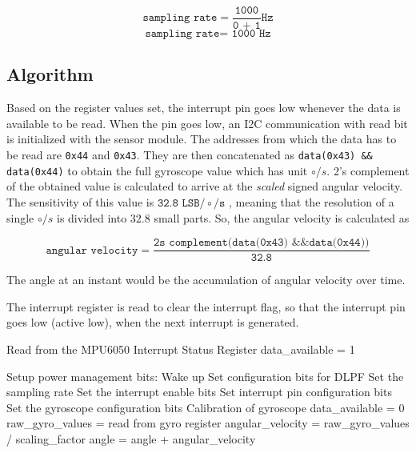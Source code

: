 \documentclass{article}
\begin{document}
	$$ \texttt{sampling rate} = \frac{\texttt{1000}}{\texttt{0 + 1}} \texttt{Hz}$$
	$$ \texttt{sampling rate} = \texttt{ 1000 Hz}$$
	
	
	\subsection{Algorithm}
	
	Based on the register values set, the interrupt pin goes low whenever the data is available to be read. When the pin goes low, an I2C communication with read bit is initialized with  the sensor module. The addresses from which the data has to be read are \texttt{0x44} and \texttt{0x43}. They are then concatenated as \texttt{data(0x43) \&\& data(0x44)} to obtain the full gyroscope value which has unit $\circ/s$. 2's complement of the obtained value is calculated to arrive at the \textit{scaled} signed angular velocity. The sensitivity of this value is $ \texttt{32.8 LSB}/\circ/\texttt{s}$ , meaning that the resolution of a single $\circ/s$ is divided into 32.8 small parts. So, the angular velocity is calculated as 
	
	$$\texttt{angular velocity} = \frac{\texttt{2s complement(data(0x43) \&\& data(0x44))}}{\texttt{32.8}} $$
	
	The angle at an instant would be the accumulation of angular velocity over time.
	
	The interrupt register is read to clear the interrupt flag, so that the interrupt pin goes low (active low), when the next interrupt is generated.
	
	\begin{algorithm}
		\label{algo:isr}
		\caption{Interrupt Service Routine (ISR)}
		\begin{algorithmic}[1]
			\State Read from the MPU6050 Interrupt Status Register
			\State data\_available = 1
		\end{algorithmic}
	\end{algorithm}
	
	\begin{algorithm}
	\label{algo:setup_mpu}
	\caption{Setup MPU6050}
	\begin{algorithmic}[1]
		\State Setup power management bits: Wake up
		\State Set configuration bits for DLPF 
		\State Set the sampling rate
		\State Set the interrupt enable bits
		\State Set interrupt pin configuration bits
		\State Set the gyroscope configuration bits
		\State Calibration of gyroscope
		\While{data\_available}
			\State data\_available = 0
			\State raw\_gyro\_values = read from gyro register
			\State angular\_velocity = raw\_gyro\_values / scaling\_factor
			\State angle = angle + angular\_velocity
		\EndWhile
	\end{algorithmic}
	\end{algorithm}
\end{document}
